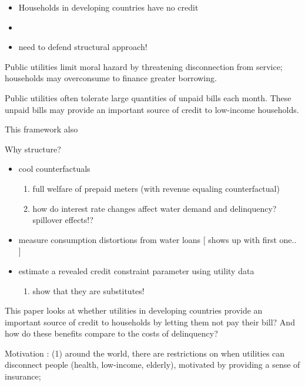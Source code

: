 \documentclass[12pt]{article}
\begin{document}
\begin{itemize}
    \item Households in developing countries have no credit
    \item 


    \item need to defend structural approach!
\end{itemize}







Public utilities limit moral hazard by threatening disconnection from service; households may overconsume to finance greater borrowing.

Public utilities often tolerate large quantities of unpaid bills each month.  These unpaid bills may provide an important source of credit to low-income households.  



This framework also 


Why structure?
\begin{itemize}
    \item cool counterfactuals
        \begin{enumerate}
            \item full welfare of prepaid meters (with revenue equaling counterfactual)
            \item how do interest rate changes affect water demand and delinquency? spillover effects!?
        \end{enumerate}
    \item measure consumption distortions from water loans [ shows up with first one.. ]
    \item estimate a revealed credit constraint parameter using utility data
        \begin{enumerate}
            \item show that they are substitutes!
        \end{enumerate}
\end{itemize}

This paper looks at whether utilities in developing countries provide an important source of credit to households by letting them not pay their bill?  And how do these benefits compare to the costs of delinquency?

Motivation : (1) around the world, there are restrictions on when utilities can disconnect people (health, low-income, elderly), motivated by providing a sense of insurance;  
\end{document}
